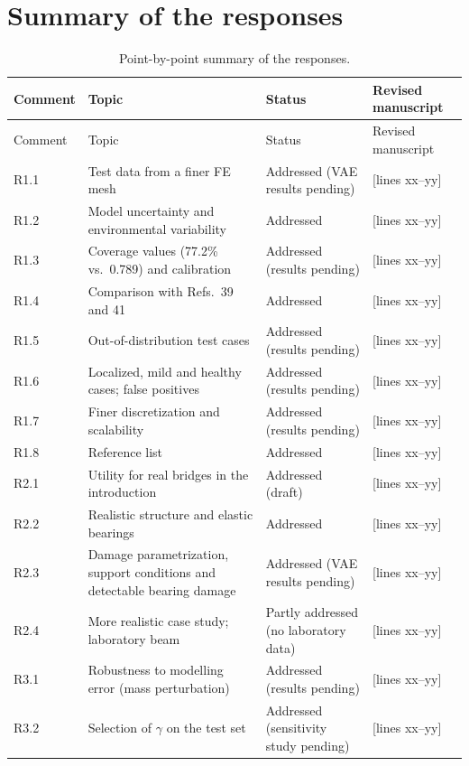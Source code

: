 \documentclass[11pt]{article}
\newcommand{\tbd}[1]{\textcolor{note}{\textsf{[#1]}}}
\newcommand{\lines}[1]{\tbd{lines #1}}
\begin{document}
\section{Summary of the responses}
{\small
\begin{longtable}{p{1.55cm}p{6.0cm}p{3.0cm}p{3.6cm}}
\caption{Point-by-point summary of the responses.}\label{tab:summary}\\
\toprule
Comment & Topic & Status & Revised manuscript \\
\midrule
\endfirsthead
\toprule
Comment & Topic & Status & Revised manuscript \\
\midrule
\endhead
R1.1 & Test data from a finer FE mesh & Addressed (VAE results pending) & \lines{xx--yy} \\
R1.2 & Model uncertainty and environmental variability & Addressed & \lines{xx--yy} \\
R1.3 & Coverage values (77.2\% vs.\ 0.789) and calibration & Addressed (results pending) & \lines{xx--yy} \\
R1.4 & Comparison with Refs.\ 39 and 41 & Addressed & \lines{xx--yy} \\
R1.5 & Out-of-distribution test cases & Addressed (results pending) & \lines{xx--yy} \\
R1.6 & Localized, mild and healthy cases; false positives & Addressed (results pending) & \lines{xx--yy} \\
R1.7 & Finer discretization and scalability & Addressed (results pending) & \lines{xx--yy} \\
R1.8 & Reference list & Addressed & \lines{xx--yy} \\
R2.1 & Utility for real bridges in the introduction & Addressed (draft) & \lines{xx--yy} \\
R2.2 & Realistic structure and elastic bearings & Addressed & \lines{xx--yy} \\
R2.3 & Damage parametrization, support conditions and detectable bearing damage & Addressed (VAE results pending) & \lines{xx--yy} \\
R2.4 & More realistic case study; laboratory beam & Partly addressed (no laboratory data) & \lines{xx--yy} \\
R3.1 & Robustness to modelling error (mass perturbation) & Addressed (results pending) & \lines{xx--yy} \\
R3.2 & Selection of $\gamma$ on the test set & Addressed (sensitivity study pending) & \lines{xx--yy} \\

\end{longtable}}
\end{document}
